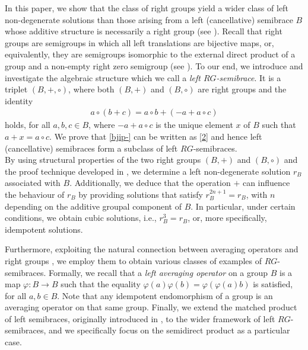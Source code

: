 \documentclass[11pt]{amsart}
\theoremstyle{definition}
\begin{document}
In this paper, we show that the class of right groups yield a wider class of left non-degenerate solutions than those arising from a left (cancellative) semibrace $B$ whose additive structure is necessarily a right group (see \cite[p.~167]{CaCoSt17}). Recall that right groups are semigroups in which all left translations are bijective maps, or, equivalently, they are semigroups isomorphic to the external direct product of a group and a non-empty right zero semigroup (see \cite[Section~1.11, Theorem~1.27]{ClPr61}). To our end, we introduce and investigate the algebraic structure which we call a {\em left $RG$-semibrace}. It is a triplet $(B,+,\circ)$, where both $(B,+)$ and $(B,\circ)$ are right groups and the identity
\begin{align}\label{bjip-}
a\circ (b + c) = a\circ b+(-a+ a\circ c)
\end{align} 
holds, for all $a,b,c\in B$, where $-a+ a\circ c$ is the unique element $x$ of $B$ such that $a+x=a\circ c$. We prove that \eqref{bjip-} can be written as \eqref{2} and hence left (cancellative) semibraces form a  subclass of left $RG$-semibraces.\\ 
By using structural properties of the two right groups $(B,+)$ and $(B,\circ)$ and the proof technique developed in \cite[cf. Theorem 2.15]{DoRySte24}, we determine a left non-degenerate solution $r_B$ associated with $B$. Additionally, we deduce that the operation $+$ can influence the behaviour of $r_{B}$ by providing solutions that satisfy $r_B^{2n+1} = r_B$, with $n$ depending on the additive groupal component of $B$.
In particular, under certain conditions, we obtain cubic solutions, i.e., $r_B^3 = r_B$, or, more specifically, idempotent solutions.


Furthermore, exploiting the natural connection between averaging operators and right groups \cite[cf. Proposition~3.8]{HuhuXing25}, we employ them to obtain various classes of examples of $RG$-semibraces. Formally, we recall that a \emph{left averaging operator} on a group $B$ is a map $\varphi:B \to B$ such that the equality
$\varphi(a)\varphi(b) = \varphi\left( \varphi(a) b \right)$ is satisfied, for all $a,b\in B$. Note that any idempotent endomorphism of a group is an averaging operator on that same group. Finally, we extend the matched product of left semibraces, originally introduced in \cite{CCSt20-1}, to the wider framework of left $RG$-semibraces, and we specifically focus on the semidirect product as a particular case.

\medskip
\end{document}
